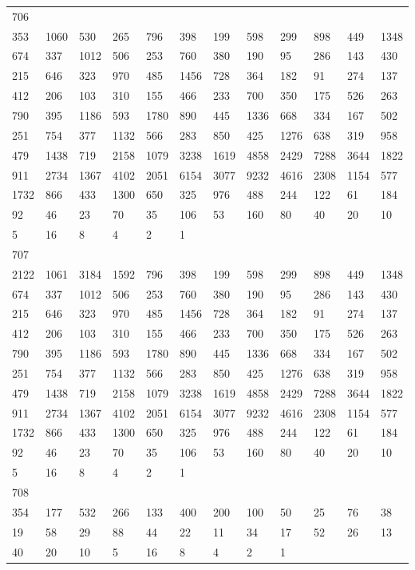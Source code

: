 \begin{longtable}{llllllllllll}
706&&&&&&&&&&&\\
353& 1060& 530& 265& 796& 398& 199& 598& 299& 898& 449& 1348\\
674& 337& 1012& 506& 253& 760& 380& 190& 95& 286& 143& 430\\
215& 646& 323& 970& 485& 1456& 728& 364& 182& 91& 274& 137\\
412& 206& 103& 310& 155& 466& 233& 700& 350& 175& 526& 263\\
790& 395& 1186& 593& 1780& 890& 445& 1336& 668& 334& 167& 502\\
251& 754& 377& 1132& 566& 283& 850& 425& 1276& 638& 319& 958\\
479& 1438& 719& 2158& 1079& 3238& 1619& 4858& 2429& 7288& 3644& 1822\\
911& 2734& 1367& 4102& 2051& 6154& 3077& 9232& 4616& 2308& 1154& 577\\
1732& 866& 433& 1300& 650& 325& 976& 488& 244& 122& 61& 184\\
92& 46& 23& 70& 35& 106& 53& 160& 80& 40& 20& 10\\
5& 16& 8& 4& 2& 1& \\

707&&&&&&&&&&&\\
2122& 1061& 3184& 1592& 796& 398& 199& 598& 299& 898& 449& 1348\\
674& 337& 1012& 506& 253& 760& 380& 190& 95& 286& 143& 430\\
215& 646& 323& 970& 485& 1456& 728& 364& 182& 91& 274& 137\\
412& 206& 103& 310& 155& 466& 233& 700& 350& 175& 526& 263\\
790& 395& 1186& 593& 1780& 890& 445& 1336& 668& 334& 167& 502\\
251& 754& 377& 1132& 566& 283& 850& 425& 1276& 638& 319& 958\\
479& 1438& 719& 2158& 1079& 3238& 1619& 4858& 2429& 7288& 3644& 1822\\
911& 2734& 1367& 4102& 2051& 6154& 3077& 9232& 4616& 2308& 1154& 577\\
1732& 866& 433& 1300& 650& 325& 976& 488& 244& 122& 61& 184\\
92& 46& 23& 70& 35& 106& 53& 160& 80& 40& 20& 10\\
5& 16& 8& 4& 2& 1& \\

708&&&&&&&&&&&\\
354& 177& 532& 266& 133& 400& 200& 100& 50& 25& 76& 38\\
19& 58& 29& 88& 44& 22& 11& 34& 17& 52& 26& 13\\
40& 20& 10& 5& 16& 8& 4& 2& 1& \\


\end{longtable}
